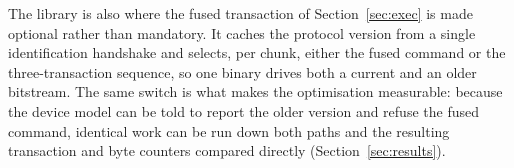 The library is also where the fused transaction of Section~\ref{sec:exec} is
made optional rather than mandatory. It caches the protocol version from a
single identification handshake and selects, per chunk, either the fused
command or the three-transaction sequence, so one binary drives both a current
and an older bitstream. The same switch is what makes the optimisation
measurable: because the device model can be told to report the older version
and refuse the fused command, identical work can be run down both paths and the
resulting transaction and byte counters compared directly
(Section~\ref{sec:results}).
